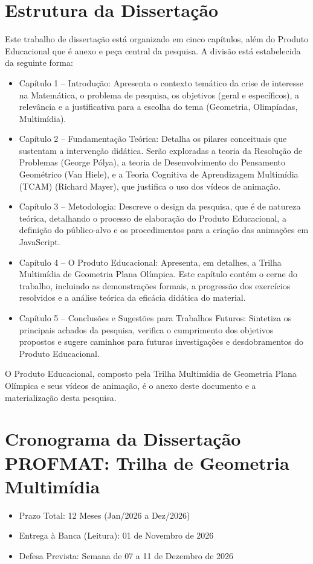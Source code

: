 \section{Estrutura da Dissertação}
Este trabalho de dissertação está organizado em cinco capítulos, além do Produto Educacional que é anexo e peça central da pesquisa. A divisão está estabelecida da seguinte forma:

\begin{itemize}
    \item Capítulo 1 – Introdução: Apresenta o contexto temático da crise de interesse na Matemática, o problema de pesquisa, os objetivos (geral e específicos), a relevância e a justificativa para a escolha do tema (Geometria, Olimpíadas, Multimídia).
    \item Capítulo 2 – Fundamentação Teórica: Detalha os pilares conceituais que sustentam a intervenção didática. Serão exploradas a teoria da Resolução de Problemas (George Pólya), a teoria de Desenvolvimento do Pensamento Geométrico (Van Hiele), e a Teoria Cognitiva de Aprendizagem Multimídia (TCAM) (Richard Mayer), que justifica o uso dos vídeos de animação.
    \item Capítulo 3 – Metodologia: Descreve o design da pesquisa, que é de natureza teórica, detalhando o processo de elaboração do Produto Educacional, a definição do público-alvo e os procedimentos para a criação das animações em JavaScript.
    \item Capítulo 4 – O Produto Educacional: Apresenta, em detalhes, a Trilha Multimídia de Geometria Plana Olímpica. Este capítulo contém o cerne do trabalho, incluindo as demonstrações formais, a progressão dos exercícios resolvidos e a análise teórica da eficácia didática do material.
    \item Capítulo 5 – Conclusões e Sugestões para Trabalhos Futuros: Sintetiza os principais achados da pesquisa, verifica o cumprimento dos objetivos propostos e sugere caminhos para futuras investigações e desdobramentos do Produto Educacional.
\end{itemize}

O Produto Educacional, composto pela Trilha Multimídia de Geometria Plana Olímpica e seus vídeos de animação, é o anexo deste documento e a materialização desta pesquisa.

 

   
\section{Cronograma da Dissertação PROFMAT: Trilha de Geometria Multimídia}
\begin{itemize}
    \item Prazo Total: 12 Meses (Jan/2026 a Dez/2026)
    \item Entrega à Banca (Leitura): 01 de Novembro de 2026
    \item Defesa Prevista: Semana de 07 a 11 de Dezembro de 2026
\end{itemize}

